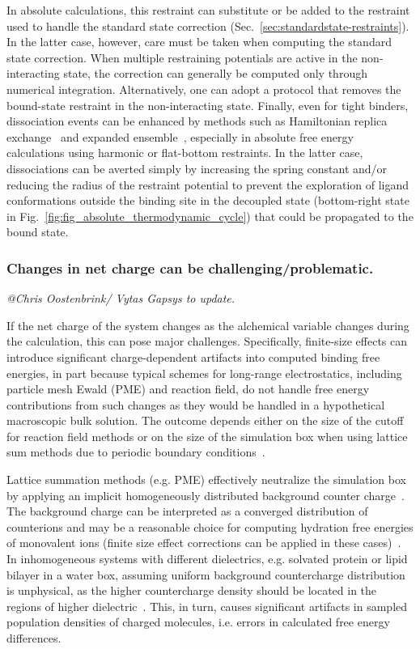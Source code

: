 \documentclass[9pt,bestpractices]{livecoms}
\makeatletter
\newcommand{\tocsubsubsectioncomment}[1]{%
  \addtocontents{toc}{%
    {\leftskip \cftsubsecindent\relax
     \advance\leftskip \cftsubsubsecnumwidth\relax
     \rightskip \@tocrmarg\relax
     \textit{#1}\protect\par}}%
  \textit{#1}\par}
\makeatother
\begin{document}
In absolute calculations, this restraint can substitute or be added to the restraint used to handle the standard state correction (Sec.~\ref{sec:standardstate-restraints}).
In the latter case, however, care must be taken when computing the standard state correction.
When multiple restraining potentials are active in the non-interacting state, the correction can generally be computed only through numerical integration.
Alternatively, one can adopt a protocol that removes the bound-state restraint in the non-interacting state.
Finally, even for tight binders, dissociation events can be enhanced by methods such as Hamiltonian replica exchange~\cite{sugita2000multidimensional,chodera2011replica,wang2013identifying} and expanded ensemble~\cite{lyubartsev1992new,li2007simulated}, especially in absolute free energy calculations using harmonic or flat-bottom restraints.
In the latter case, dissociations can be averted simply by increasing the spring constant and/or reducing the radius of the restraint potential to prevent the exploration of ligand conformations outside the binding site in the decoupled state (bottom-right state in Fig.~\ref{fig:fig_absolute_thermodynamic_cycle}) that could be propagated to the bound state.

\subsubsection{Changes in net charge can be challenging/problematic.}
\tocsubsubsectioncomment{@Chris Oostenbrink/ Vytas Gapsys to update.}
If the net charge of the system changes as the alchemical variable changes during the calculation, this can pose major challenges.
Specifically, finite-size effects can introduce significant charge-dependent artifacts into computed binding free energies, in part because typical schemes for long-range electrostatics, including particle mesh Ewald (PME) and reaction field, do not handle free energy contributions from such changes as they would be handled in a hypothetical macroscopic bulk solution. The outcome depends either on the size of the cutoff for reaction field methods or on the size of the simulation box when using lattice sum methods due to periodic boundary conditions~\cite{lin2014overview, ohlknecht2020correcting, rocklin2013calculating}.

Lattice summation methods (e.g. PME) effectively neutralize the simulation box by applying an implicit homogeneously distributed background counter charge~\cite{figueirido1995finite,hummer1996free}. The background charge can be interpreted as a converged distribution of counterions and may be a reasonable choice for computing hydration free energies of monovalent ions (finite size effect corrections can be applied in these cases)~\cite{hummer1996free}. In inhomogeneous systems with different dielectrics, e.g. solvated protein or lipid bilayer in a water box, assuming uniform background countercharge distribution is unphysical, as the higher countercharge density should be located in the regions of higher dielectric~\cite{hub2014pme}. This, in turn, causes significant artifacts in sampled population densities of charged molecules, i.e. errors in calculated free energy differences.
\end{document}
